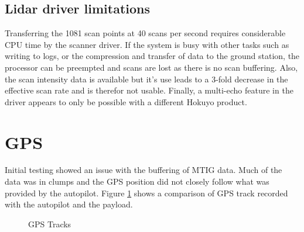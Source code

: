 \documentclass[a4paper,11pt]{report}
\begin{document}
\subsection{Lidar driver limitations}

Transferring the 1081 scan points at 40 scans per second requires considerable CPU time by the scanner driver. If the system is busy with other tasks such as writing to logs, or the compression and transfer of data to the ground station, the processor can be preempted and scans are lost as there is no scan buffering. Also, the scan intensity data is available but it's use leads to a 3-fold decrease in the effective scan rate and is therefor not usable. Finally, a multi-echo feature in the driver appears to only be possible with a different Hokuyo product.

\section{GPS}

Initial testing showed an issue with the buffering of MTIG data. Much of the data was in clumps and the GPS position did not closely follow what was provided by the autopilot. Figure \ref{fig:track_comp} shows a comparison of GPS track recorded with the autopilot and the payload.

\begin{figure}[ht]
  \centering
  \caption{GPS Tracks}
  \label{fig:track_comp}
\end{figure} 
\end{document}
